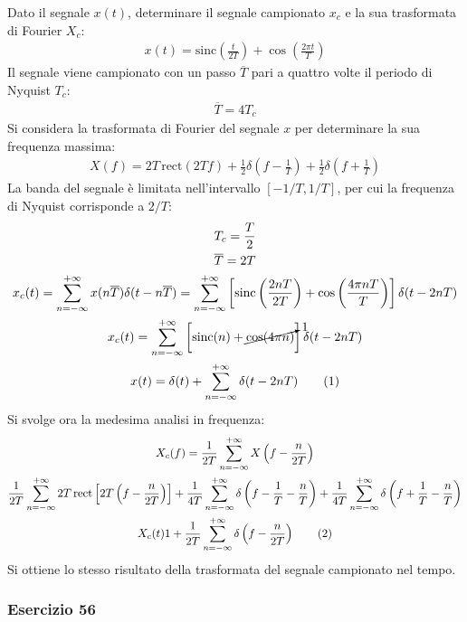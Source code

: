 \documentclass{article}
\newcommand{\rect}{\mathrm{rect}}
\newcommand{\sinc}{\mathrm{sinc}}
\newcommand{\tageq}{\tag{\stepcounter{equation}\theequation}}
\begin{document}
Dato il segnale $x(t)$, determinare il segnale campionato $x_c$ e la sua trasformata di Fourier $X_c$:
\begin{gather*}
    x(t)=\sinc\left(\displaystyle\frac{t}{2T}\right)+\cos\left(\frac{2\pi t}{T}\right)
\end{gather*}
Il segnale viene campionato con un passo $\overline{T}$ pari a quattro volte il periodo di Nyquist $T_c$:
\begin{gather*}
    \overline{T}=4T_c
\end{gather*}
Si considera la trasformata di Fourier del segnale $x$ per determinare la sua frequenza massima:
\begin{gather*}
    X(f)=2T\,\rect(2Tf)+\displaystyle\frac{1}{2}\delta\left(f-\frac{1}{T}\right)+\frac{1}{2}\delta\left(f+\frac{1}{T}\right)
\end{gather*}
La banda del segnale è limitata nell'intervallo $[-1/T, 1/T]$, per cui la frequenza di Nyquist corrisponde a $2/T$:
\begin{gather*}
    T_c=\displaystyle\frac{T}{2}\\
    \overline{T}=2T\\
    x_c(t)=\displaystyle\sum_{n=-\infty}^{+\infty}x(n\overline{T})\delta(t-n\overline{T})=\sum_{n=-\infty}^{+\infty}\left[\sinc\left(\frac{2nT}{2T}\right)+\cos\left(\frac{4\pi nT}{T}\right)\right]\delta(t-2nT)\\
    x_c(t)=\displaystyle\sum_{n=-\infty}^{+\infty}\left[\sinc(n)+\cancelto{1}{\cos(4\pi n)}\right]\delta(t-2nT)\\
    x(t)=\displaystyle\delta(t)+\sum_{n=-\infty}^{+\infty}\delta(t-2nT)\tageq
\end{gather*}
Si svolge ora la medesima analisi in frequenza:
\begin{gather*}
    X_c(f)=\displaystyle\frac{1}{2T}\sum_{n=-\infty}^{+\infty}X\left(f-\frac{n}{2T}\right)\\
    \displaystyle\frac{1}{2T}\sum_{n=-\infty}^{+\infty}2T\,\rect\left[2T\left(f-\frac{n}{2T}\right)\right]+\frac{1}{4T}\sum_{n=-\infty}^{+\infty}\delta\left(f-\frac{1}{T}-\frac{n}{T}\right)+\frac{1}{4T}\sum_{n=-\infty}^{+\infty}\delta\left(f+\frac{1}{T}-\frac{n}{T}\right)\\
    X_c(t)1+\displaystyle\frac{1}{2T}\sum_{n=-\infty}^{+\infty}\delta\left(f-\frac{n}{2T}\right)\tageq
\end{gather*}
Si ottiene lo stesso risultato della trasformata del segnale campionato nel tempo. 

\subsubsection*{Esercizio 56}
\end{document}
